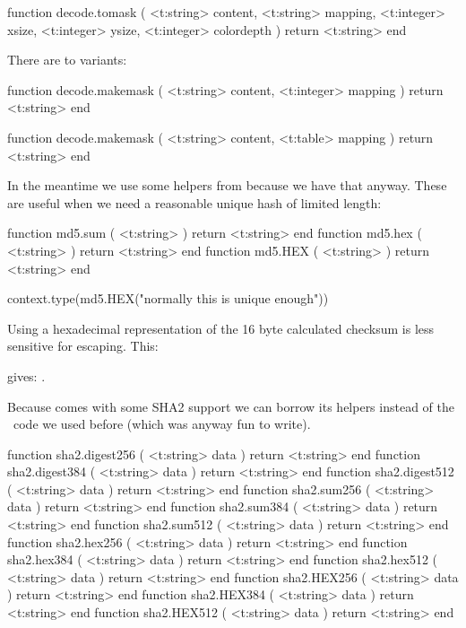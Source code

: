 \starttyping[option=LUA]
function decode.tomask (
    <t:string>  content,
    <t:string>  mapping,
    <t:integer> xsize,
    <t:integer> ysize,
    <t:integer> colordepth
)
    return <t:string>
end
\stoptyping

There are to variants:

\starttyping[option=LUA]
function decode.makemask (
    <t:string>  content,
    <t:integer> mapping
)
    return <t:string>
end

function decode.makemask (
    <t:string> content,
    <t:table>  mapping
)
    return <t:string>
end
\stoptyping

\stopsubsection

\startsubsection[title=MD5 hashing]

In the meantime we use some helpers from  because we have that
anyway. These are useful when we need a reasonable unique hash of limited length:

\starttyping[option=LUA]
function md5.sum ( <t:string> ) return <t:string> end
function md5.hex ( <t:string> ) return <t:string> end
function md5.HEX ( <t:string> ) return <t:string> end
\stoptyping

\startbuffer
\startluacode
context.type(md5.HEX("normally this is unique enough"))
\stopluacode
\stopbuffer

Using a hexadecimal representation of the 16 byte calculated checksum is less
sensitive for escaping. This:

\typebuffer

gives: \inlinebuffer.

\stopsubsection

\startsubsection[title=SHA2 hashing]

Because  comes with some SHA2 support we can borrow its helpers
instead of the \LUA\ code we used before (which was anyway fun to write).

\starttyping[option=LUA]
function sha2.digest256 ( <t:string> data ) return <t:string> end
function sha2.digest384 ( <t:string> data ) return <t:string> end
function sha2.digest512 ( <t:string> data ) return <t:string> end
function sha2.sum256    ( <t:string> data ) return <t:string> end
function sha2.sum384    ( <t:string> data ) return <t:string> end
function sha2.sum512    ( <t:string> data ) return <t:string> end
function sha2.hex256    ( <t:string> data ) return <t:string> end
function sha2.hex384    ( <t:string> data ) return <t:string> end
function sha2.hex512    ( <t:string> data ) return <t:string> end
function sha2.HEX256    ( <t:string> data ) return <t:string> end
function sha2.HEX384    ( <t:string> data ) return <t:string> end
function sha2.HEX512    ( <t:string> data ) return <t:string> end
\stoptyping

